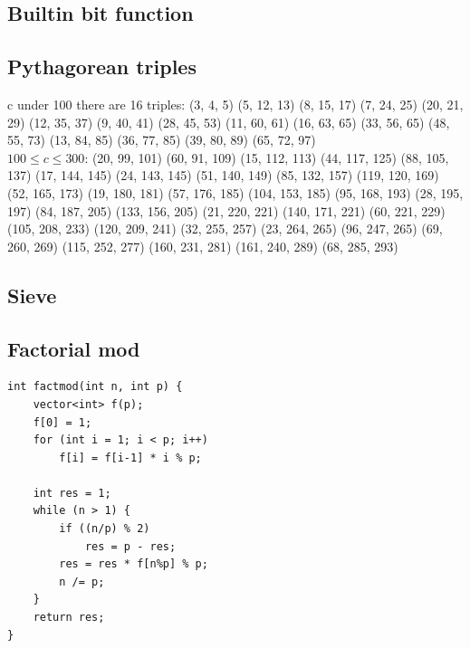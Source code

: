 \documentclass[a4paper, 12pt, oneside, landscape]{article}
\begin{document}
\begin{multicols}{2}
	\subsection{Builtin bit function}
	
	
	\subsection{Pythagorean triples}
	c under 100 there are 16 triples:
	(3, 4, 5)	(5, 12, 13)	(8, 15, 17)	(7, 24, 25)
(20, 21, 29)	(12, 35, 37)	(9, 40, 41)	(28, 45, 53)
(11, 60, 61)	(16, 63, 65)	(33, 56, 65)	(48, 55, 73)
(13, 84, 85)	(36, 77, 85)	(39, 80, 89)	(65, 72, 97) \\

	$100 \leq c \leq 300$:
	(20, 99, 101)	(60, 91, 109)	(15, 112, 113)	(44, 117, 125)
(88, 105, 137)	(17, 144, 145)	(24, 143, 145)	(51, 140, 149)
(85, 132, 157)	(119, 120, 169)	(52, 165, 173)	(19, 180, 181)
(57, 176, 185)	(104, 153, 185)	(95, 168, 193)	(28, 195, 197)
(84, 187, 205)	(133, 156, 205)	(21, 220, 221)	(140, 171, 221)
(60, 221, 229)	(105, 208, 233)	(120, 209, 241)	(32, 255, 257)
(23, 264, 265)	(96, 247, 265)	(69, 260, 269)	(115, 252, 277)
(160, 231, 281)	(161, 240, 289)	(68, 285, 293)

	\subsection{Sieve}
	

    \subsection{Factorial mod}
    \begin{lstlisting}
int factmod(int n, int p) {
    vector<int> f(p);
    f[0] = 1;
    for (int i = 1; i < p; i++)
        f[i] = f[i-1] * i % p;

    int res = 1;
    while (n > 1) {
        if ((n/p) % 2)
            res = p - res;
        res = res * f[n%p] % p;
        n /= p;
    }
    return res; 
}
    \end{lstlisting}


\end{multicols}
\end{document}
